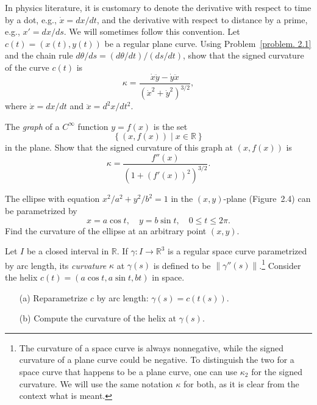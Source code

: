 \begin{problem}
    In physics literature, it is customary to denote the derivative with respect to time by a dot,
    e.g., $\dot{x} = dx/dt$, and the derivative with respect to distance by a prime, 
    e.g., $x' = dx/ds$. We will sometimes follow this convention.
    Let $c(t) = (x(t), y(t))$ be a regular plane curve. 
    Using Problem~\ref{problem. 2.1} and the chain rule 
    $d\theta/ds = (d\theta/dt)/(ds/dt)$, 
    show that the signed curvature of the curve $c(t)$ is
\[
\kappa = \frac{\dot{x}\ddot{y} - \dot{y}\ddot{x}}{(\dot{x}^2 + \dot{y}^2)^{3/2}},
\]
where $\dot{x} = dx/dt$ and $\ddot{x} = d^2x/dt^2$.
\end{problem}

\begin{problem}
    The \emph{graph} of a $C^\infty$ function $y = f(x)$ is the set
\[
\left\{ (x, f(x)) \mid x \in \mathbb{R} \right\}
\]
in the plane. Show that the signed curvature of this graph at $(x, f(x))$ is
\[
\kappa = \frac{f''(x)}{\left(1 + \left(f'(x)\right)^2\right)^{3/2}}.
\]
\end{problem}

\begin{problem}
    The ellipse with equation $x^2/a^2 + y^2/b^2 = 1$ in the $(x,y)$-plane (Figure~2.4) 
    can be parametrized by
\[
x = a\cos t, \quad y = b\sin t, \quad 0 \leq t \leq 2\pi.
\]
Find the curvature of the ellipse at an arbitrary point $(x,y)$.
\end{problem}

\begin{problem}
    Let $I$ be a closed interval in $\mathbb{R}$. If $\gamma \colon I \to \mathbb{R}^3$ is
     a regular space curve parametrized by arc length, 
     its \emph{curvature} $\kappa$ at $\gamma(s)$ is defined to be 
     $\|\gamma''(s)\|$.\footnote{The curvature of a space curve is always nonnegative,
      while the signed curvature of a plane curve could be negative.
       To distinguish the two for a space curve that happens to be a plane curve, 
       one can use $\kappa_2$ for the signed curvature. 
       We will use the same notation $\kappa$ for both, 
     as it is clear from the context what is meant.} 
     Consider the helix $c(t) = (a\cos t, a\sin t, bt)$ in space.

\begin{enumerate}
    \item[(a)] Reparametrize $c$ by arc length: $\gamma(s) = c(t(s))$.
    \item[(b)] Compute the curvature of the helix at $\gamma(s)$.
\end{enumerate}
\end{problem}